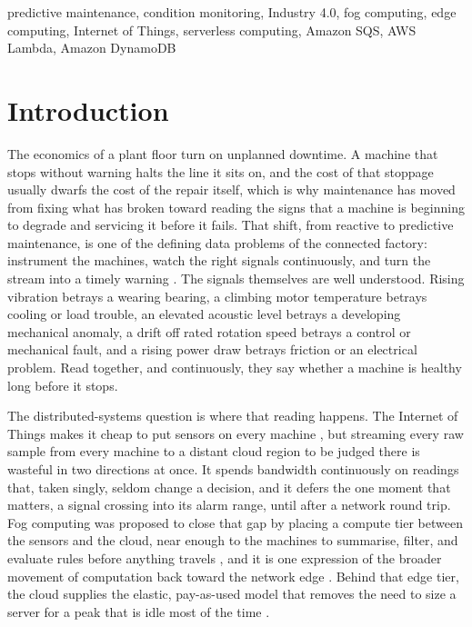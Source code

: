 \documentclass[conference]{IEEEtran}
\begin{document}
\begin{IEEEkeywords}
predictive maintenance, condition monitoring, Industry 4.0, fog computing, edge computing, Internet of Things, serverless computing, Amazon SQS, AWS Lambda, Amazon DynamoDB
\end{IEEEkeywords}

\section{Introduction}

The economics of a plant floor turn on unplanned downtime. A machine that stops without warning halts the line it sits on, and the cost of that stoppage usually dwarfs the cost of the repair itself, which is why maintenance has moved from fixing what has broken toward reading the signs that a machine is beginning to degrade and servicing it before it fails. That shift, from reactive to predictive maintenance, is one of the defining data problems of the connected factory: instrument the machines, watch the right signals continuously, and turn the stream into a timely warning \cite{lee2015, zhang2019}. The signals themselves are well understood. Rising vibration betrays a wearing bearing, a climbing motor temperature betrays cooling or load trouble, an elevated acoustic level betrays a developing mechanical anomaly, a drift off rated rotation speed betrays a control or mechanical fault, and a rising power draw betrays friction or an electrical problem. Read together, and continuously, they say whether a machine is healthy long before it stops.

The distributed-systems question is where that reading happens. The Internet of Things makes it cheap to put sensors on every machine \cite{atzori2010}, but streaming every raw sample from every machine to a distant cloud region to be judged there is wasteful in two directions at once. It spends bandwidth continuously on readings that, taken singly, seldom change a decision, and it defers the one moment that matters, a signal crossing into its alarm range, until after a network round trip. Fog computing was proposed to close that gap by placing a compute tier between the sensors and the cloud, near enough to the machines to summarise, filter, and evaluate rules before anything travels \cite{bonomi2012, yousefpour2019}, and it is one expression of the broader movement of computation back toward the network edge \cite{shi2016, satyanarayanan2017}. Behind that edge tier, the cloud supplies the elastic, pay-as-used model that removes the need to size a server for a peak that is idle most of the time \cite{armbrust2010}.
\end{document}
